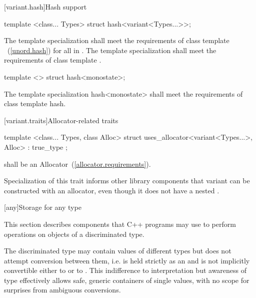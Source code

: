 [variant.hash]{Hash support}

%
\begin{itemdecl}
template <class... Types> struct hash<variant<Types...>>;
\end{itemdecl}

\begin{itemdescr}
\pnum
The template specialization  shall meet the requirements
of class template ~(\ref{unord.hash}) for all  in .
The template specialization  shall meet
the requirements of class template .
\end{itemdescr}

%
\begin{itemdecl}
template <> struct hash<monostate>;
\end{itemdecl}

\begin{itemdescr}
\pnum
The template specialization hash<monostate> shall meet the requirements of class template hash.
\end{itemdescr}


[variant.traits]{Allocator-related traits}

%
\begin{itemdecl}
template <class... Types, class Alloc>
  struct uses_allocator<variant<Types...>, Alloc> : true_type { };
\end{itemdecl}

\begin{itemdescr}
\pnum
\requires {} shall be an Allocator~(\ref{allocator.requirements}).

\pnum
\begin{note}
Specialization of this trait informs other library components
that variant can be constructed with an allocator,
even though it does not have a nested .
\end{note}
\end{itemdescr}


[any]{Storage for any type}

\pnum
This section describes components that C++ programs may use to perform operations on objects of a discriminated type.

\pnum
\begin{note}
The discriminated type may contain values of different types but does not attempt conversion between them,
i.e.  is held strictly as an  and is not implicitly convertible either to  or to .
This indifference to interpretation but awareness of type effectively allows safe, generic containers of single values, with no scope for surprises from ambiguous conversions.
\end{note}

